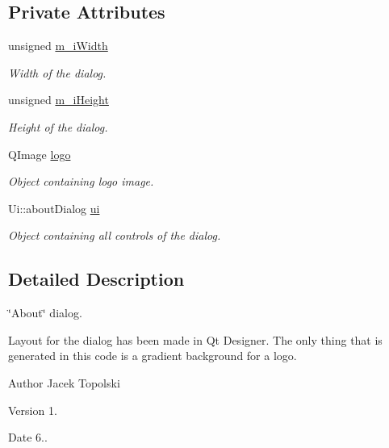 \subsection*{Private Attributes}
\begin{DoxyCompactItemize}
\item 
unsigned \hyperlink{class_about_dialog_a57772dce12e9b11f8b77488c4bfd9502}{m\-\_\-i\-Width}
\begin{DoxyCompactList}\small\item\em Width of the dialog. \end{DoxyCompactList}\item 
unsigned \hyperlink{class_about_dialog_a66a8aa7f00755ed127b3bdfa1da0912c}{m\-\_\-i\-Height}
\begin{DoxyCompactList}\small\item\em Height of the dialog. \end{DoxyCompactList}\item 
Q\-Image \hyperlink{class_about_dialog_a2c2d0746aeb878e67406fa921ee8cab5}{logo}
\begin{DoxyCompactList}\small\item\em Object containing logo image. \end{DoxyCompactList}\item 
Ui\-::about\-Dialog \hyperlink{class_about_dialog_a09973e2e1adc7a6ee6271d2c6f67796a}{ui}
\begin{DoxyCompactList}\small\item\em Object containing all controls of the dialog. \end{DoxyCompactList}\end{DoxyCompactItemize}


\subsection{Detailed Description}
\char`\"{}\-About\char`\"{} dialog. 

Layout for the dialog has been made in Qt Designer. The only thing that is generated in this code is a gradient background for a logo. \begin{DoxyAuthor}{Author}
Jacek Topolski 
\end{DoxyAuthor}
\begin{DoxyVersion}{Version}
1. 
\end{DoxyVersion}
\begin{DoxyDate}{Date}
6.. 
\end{DoxyDate}


